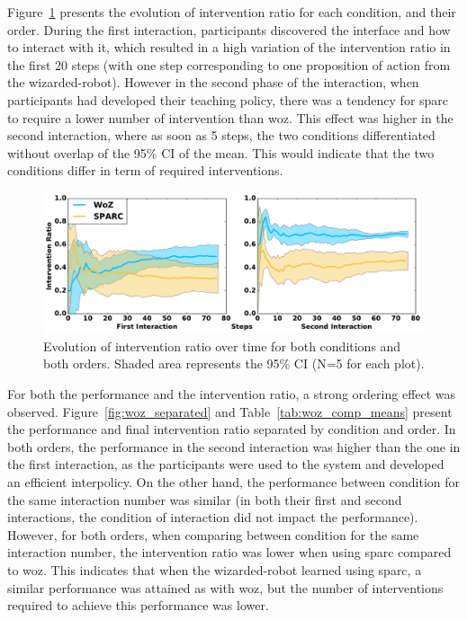 Figure~\ref{fig:woz_ratio_time} presents the evolution of intervention ratio for each condition, and their order. During the first interaction, participants discovered the interface and how to interact with it, which resulted in a high variation of the intervention ratio in the first 20 steps (with one step corresponding to one proposition of action from the wizarded-robot). However in the second phase of the interaction, when participants had developed their teaching policy, there was a tendency for \gls{sparc} to require a lower number of intervention than \gls{woz}. This effect was higher in the second interaction, where as soon as 5 steps, the two conditions differentiated without overlap of the 95\% CI of the mean. This would indicate that the two conditions differ in term of required interventions.

\begin{figure}[ht]
	\centering
	\includegraphics[width=1.\textwidth]{ratio_time.pdf}
	\caption{Evolution of intervention ratio over time for both conditions and both orders. Shaded area represents the 95\% CI (N=5 for each plot).}
	\label{fig:woz_ratio_time}
\end{figure}

For both the performance and the intervention ratio, a strong ordering effect was observed. Figure~\ref{fig:woz_separated} and Table~\ref{tab:woz_comp_means} present the performance and final intervention ratio separated by condition and order. In both orders, the performance in the second interaction was higher than the one in the first interaction, as the participants were used to the system and developed an efficient interpolicy. On the other hand, the performance between condition for the same interaction number was similar (in both their first and second interactions, the condition of interaction did not impact the performance). However, for both orders, when comparing between condition for the same interaction number, the intervention ratio was lower when using \gls{sparc} compared to \gls{woz}. This indicates that when the wizarded-robot learned using \gls{sparc}, a similar performance was attained as with \gls{woz}, but the number of interventions required to achieve this performance was lower.

